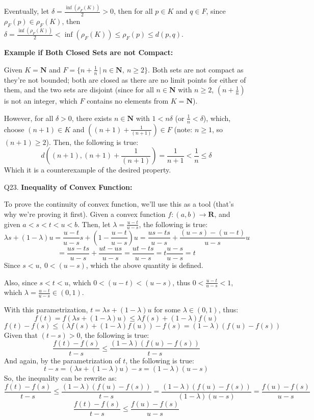 \documentclass{article}
\begin{document}
\begin{itemize}
    Eventually, let $\delta = \frac{\inf(\rho_F(K))}{2} >0$, then for all $p\in K$ and $q\in F$, since $\rho_F(p) \in \rho_F(K)$, then $\delta = \frac{\inf(\rho_F(K))}{2} < \inf(\rho_F(K)) \leq \rho_F(p) \leq d(p,q)$.

    \hfill

    \textbf{Example if Both Closed Sets are not Compact:}
    
    Given $K = \mathbf{N}$ and $F=\{n+\frac{1}{n}\ |\ n\in\mathbf{N},\ n\geq 2\}$. Both sets are not compact as they're not bounded; both are closed as there are no limit points for either of them, and the two sets are disjoint (since for all $n\in \mathbf{N}$ with $n\geq 2$, $(n+\frac{1}{n})$ is not an integer, which $F$ contains no elements from $K=\mathbf{N}$). 

    However, for all $\delta>0$, there exists $n\in\mathbf{N}$ with $1<n\delta$ (or $\frac{1}{n}<\delta$), which, choose $(n+1)\in K$ and $((n+1)+\frac{1}{(n+1)}) \in F$ (note: $n\geq 1$, so $(n+1)\geq 2$). Then, the following is true:
    $$d\left((n+1),(n+1)+\frac{1}{(n+1)}\right) = \frac{1}{n+1} < \frac{1}{n} \leq \delta$$
    Which it is a counterexample of the desired property.

    \break

    \item[Q23.]
    \textbf{Inequality of Convex Function:}

    To prove the continuity of convex function, we'll use this as a tool (that's why we're proving it first). Given a convex function $f:(a,b)\rightarrow\mathbf{R}$, and given $a<s<t<u<b$. Then, let $\lambda = \frac{u-t}{u-s}$, the following is true:
    $$\lambda s + (1-\lambda)u = \frac{u-t}{u-s}s + \left(1-\frac{u-t}{u-s}\right)u = \frac{us-ts}{u-s} + \frac{(u-s)-(u-t)}{u-s}u$$
    $$ = \frac{us-ts}{u-s}+\frac{ut-us}{u-s} = \frac{ut-ts}{u-s} = t\frac{u-s}{u-s} = t$$
    Since $s<u,\ 0<(u-s)$, which the above quantity is defined.

    Also, since $s<t<u$, which $0<(u-t)<(u-s)$, thus $0 < \frac{u-t}{u-s} < 1$, which $\lambda = \frac{u-t}{u-s} \in (0,1)$.

    With this parametrization, $t = \lambda s + (1-\lambda)u$ for some $\lambda \in (0,1)$, thus:
    $$f(t) = f(\lambda s + (1-\lambda)u) \leq \lambda f(s)+(1-\lambda)f(u)$$
    $$f(t)-f(s) \leq (\lambda f(s)+(1-\lambda)f(u)) - f(s) = (1-\lambda)(f(u)-f(s))$$
    Given that $(t-s) >0$, the following is true:
    $$\frac{f(t)-f(s)}{t-s} \leq \frac{(1-\lambda)(f(u)-f(s))}{t-s}$$
    And again, by the parametrization of $t$, the following is true:
    $$t-s = (\lambda s+(1-\lambda)u)-s = (1-\lambda)(u-s)$$
    So, the inequality can be rewrite as:
    $$\frac{f(t)-f(s)}{t-s} \leq \frac{(1-\lambda)(f(u)-f(s))}{t-s} = \frac{(1-\lambda)(f(u)-f(s))}{(1-\lambda)(u-s)}=\frac{f(u)-f(s)}{u-s}$$
    $$\frac{f(t)-f(s)}{t-s} \leq \frac{f(u)-f(s)}{u-s}$$


\end{itemize}
\end{document}
